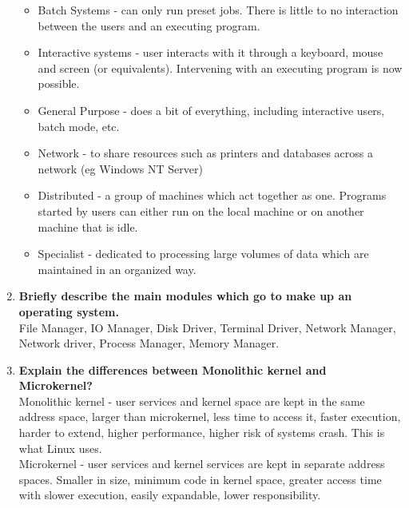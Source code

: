\begin{enumerate}
    \begin{itemize}
        \item Batch Systems - can only run preset jobs. There is little to no interaction between the users and an executing program.
        \item Interactive systems - user interacts with it through a keyboard, mouse and screen (or equivalents). Intervening with an executing program is now possible.
        \item General Purpose - does a bit of everything, including interactive users, batch mode, etc.
        \item Network - to share resources such as printers and databases across a network (eg Windows NT Server)
        \item Distributed - a group of machines which act together as one. Programs started by users can either run on the local machine or on another machine that is idle.
        \item Specialist - dedicated to processing large volumes of data which are maintained in an organized way.
    \end{itemize}
    \item \textbf{Briefly describe the main modules which go to make up an operating system. }\\
    File Manager, IO Manager, Disk Driver, Terminal Driver, Network Manager, Network driver, Process Manager, Memory Manager.
    \item \textbf{Explain the differences between Monolithic kernel and Microkernel?}\\
    Monolithic kernel - user services and kernel space are kept in the same address space, larger than microkernel, less time to access it, faster execution, harder to extend, higher performance, higher risk of systems crash. This is what Linux uses.\\
    Microkernel - user services and kernel services are kept in separate address spaces. Smaller in size, minimum code in kernel space, greater access time with slower execution, easily expandable, lower responsibility.
\end{enumerate}